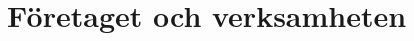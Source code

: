 \documentclass[../report.tex]{subfiles}
\begin{document}
    \chapter{Företaget och verksamheten}
\end{document}
